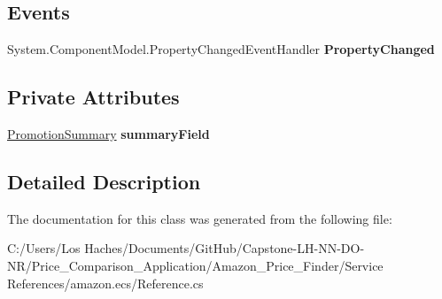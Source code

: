 \subsection*{Events}
\begin{DoxyCompactItemize}
\item 
\hypertarget{class_price___comparison_1_1amazon_1_1ecs_1_1_promotion_a00ef1422bbdd8a7df241847471b2b054}{System.\-Component\-Model.\-Property\-Changed\-Event\-Handler {\bfseries Property\-Changed}}\label{class_price___comparison_1_1amazon_1_1ecs_1_1_promotion_a00ef1422bbdd8a7df241847471b2b054}

\end{DoxyCompactItemize}
\subsection*{Private Attributes}
\begin{DoxyCompactItemize}
\item 
\hypertarget{class_price___comparison_1_1amazon_1_1ecs_1_1_promotion_a38dba1d85c7efe09f17d8d93374d9b8f}{\hyperlink{class_price___comparison_1_1amazon_1_1ecs_1_1_promotion_summary}{Promotion\-Summary} {\bfseries summary\-Field}}\label{class_price___comparison_1_1amazon_1_1ecs_1_1_promotion_a38dba1d85c7efe09f17d8d93374d9b8f}

\end{DoxyCompactItemize}


\subsection{Detailed Description}


The documentation for this class was generated from the following file\-:\begin{DoxyCompactItemize}
\item 
C\-:/\-Users/\-Los Haches/\-Documents/\-Git\-Hub/\-Capstone-\/\-L\-H-\/\-N\-N-\/\-D\-O-\/\-N\-R/\-Price\-\_\-\-Comparison\-\_\-\-Application/\-Amazon\-\_\-\-Price\-\_\-\-Finder/\-Service References/amazon.\-ecs/Reference.\-cs\end{DoxyCompactItemize}
